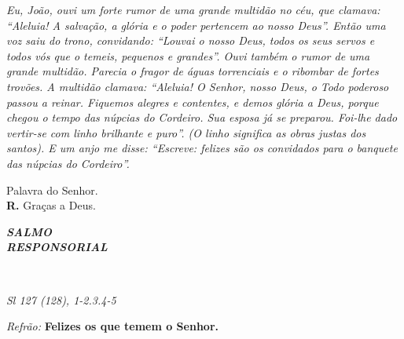 \documentclass[a5paper,9pt]{memoir}
\begin{document}
{\begin{paracol}{2}
	\itshape
	Eu, Jo\~ao, ouvi um forte rumor de uma grande multid\~ao no c\'eu, que clamava: ``Aleluia! A salva\c c\~ao, a gl\'oria e o poder pertencem ao nosso Deus''. Ent\~ao uma voz saiu do trono, convidando: ``Louvai o nosso Deus, todos os seus servos e todos v\'os que o temeis, pequenos e grandes''. Ouvi tamb\'em o rumor de uma grande multid\~ao. Parecia o fragor de \'aguas torrenciais e o ribombar de fortes trov\~oes. A multid\~ao clamava: ``Aleluia! O Senhor, nosso Deus, o Todo poderoso passou a reinar. Fiquemos alegres e contentes, e demos gl\'oria a Deus, porque chegou o tempo das n\'upcias do Cordeiro. Sua esposa j\'a se preparou. Foi-lhe dado vertir-se com linho brilhante e puro''. (O linho significa as obras justas dos santos). E um anjo me disse: ``Escreve: felizes s\~ao os convidados para o banquete das n\'upcias do Cordeiro''.
\end{paracol}

Palavra do Senhor.\\
\textbf{R.} Graças a Deus.

\vspace{-0.8cm}
\begin{center}
\begin{minipage}[t]{0.5\linewidth}
\itshape \color{mygray}\textbf{SALMO\\ RESPONSORIAL}
\end{minipage}~
\begin{minipage}[t]{0.5\linewidth}
\itshape \color{mygray}
\hfill Sl 127 (128), 1-2.3.4-5
\end{minipage}
\end{center}

{\itshape \color{mygray}Refr\~ao:} \textbf{Felizes os que temem o Senhor.}

}
\end{document}
